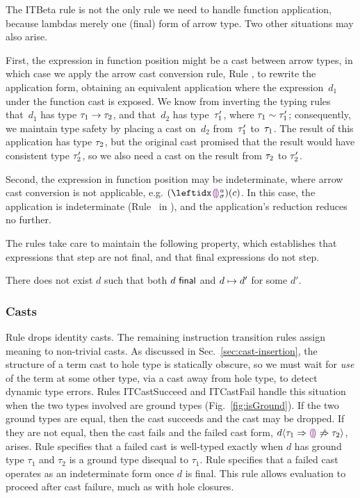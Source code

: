 




The ITBeta rule is not the only rule we need to handle function
application, because lambdas merely one (final) form of arrow type.
%
Two other situations may also arise.

First, the expression in function position might be a cast between
arrow types, in which case we apply the arrow cast conversion rule,
Rule , to rewrite the application form, obtaining an
equivalent application where the expression~$d_1$ under the function
cast is exposed.
%
We know from inverting the typing rules that~$d_1$ has type
$\tau_1 \rightarrow \tau_2$, and that~$d_2$ has type~$\tau_1'$, where
$\tau_1 \sim \tau_1'$; consequently, we maintain type
safety by placing a cast on~$d_2$ from~$\tau_1'$ to~$\tau_1$.
%
The result of this application has type $\tau_2$, but the
original cast promised that the result would have consistent type
$\tau_2'$, so we also need a cast on the result from $\tau_2$ to
$\tau_2'$.

Second, the expression in function position may be indeterminate,
where arrow cast conversion is not applicable,
e.g. $\hap{(\dehole{u}{\sigma}{})}{c}$.
%
In this case, the application is indeterminate (Rule~
in ), and the application's reduction reduces no
further.



The rules take care to maintain the following property, which establishes that expressions that step are not final, and that final expressions do not step.%
%
\begin{thm}[Finality] There does not exist $d$ such that both $d~\mathsf{final}$ and $d \mapsto d'$ for some $d'$.
\end{thm}

\subsubsection{Casts}
Rule  drops identity casts. The remaining instruction
transition rules assign meaning to non-trivial casts.
%
As discussed in Sec.~\ref{sec:cast-insertion}, the structure of a term
cast to hole type is statically obscure,
%
so we must wait for \emph{use} of the term at some other type, via a
cast away from hole type, to detect dynamic type errors.
%
Rules {ITCastSucceed} and {ITCastFail} handle this situation when the
two types involved are ground types (Fig.~\ref{fig:isGround}).
%
If the two ground types are equal, then the cast succeeds and the cast
may be dropped.
%
If they are not equal, then the cast fails and the failed cast form,
$d \langle{\tau_1}\Rightarrow{\textcolor{violet}{\llparenthesis}\textcolor{violet}{\rrparenthesis}}\not\Rightarrow{\tau_2}\rangle$, arises.
%
Rule  specifies that a failed cast is well-typed exactly
when $d$ has ground type $\tau_1$ and $\tau_2$ is a ground type
disequal to $\tau_1$.
%
Rule  specifies that a failed cast operates as an
indeterminate form once $d$ is final.
%
This rule allows evaluation to proceed after cast failure, much as
with hole closures.


